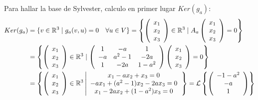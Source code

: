 \documentclass[12pt]{article}
\begin{document}
\begin{ejercicio}
    Para hallar la base de Sylvester, calculo en primer lugar $Ker(g_a)$:
    \begin{equation*}\begin{split}
        Ker(g_a) &= \{v \in \mathbb{R}^3 \mid g_a(v,u) = 0 \quad \forall u\in V\} 
        = \left\{ \left(\begin{array}{c}
             x_1 \\ x_2 \\ x_3
        \end{array} \right) \in \mathbb{R}^3 \mid A_a
        \left(\begin{array}{c}
             x_1 \\ x_2 \\ x_3
        \end{array} \right) = 0\right\} \\
        &= \left\{ \left(\begin{array}{c}
             x_1 \\ x_2 \\ x_3
        \end{array} \right) \in \mathbb{R}^3 \mid
        \left(\begin{array}{ccc}
            1 & -a & 1 \\
            -a & a^2-1 & -2a \\
            1 & -2a & 1-a^2
        \end{array} \right) 
        \left(\begin{array}{c}
             x_1 \\ x_2 \\ x_3
        \end{array} \right) = 0\right\} \\
        &= \left\{ \left(\begin{array}{c}
             x_1 \\ x_2 \\ x_3
        \end{array} \right) \in \mathbb{R}^3 \left|\begin{array}{c}
            x_1-ax_2+x_3 = 0\\
            -ax_1 +(a^2-1)x_2-2ax_3 = 0\\
            x_1-2ax_2+(1-a^2)x_3=0
        \end{array}
        \right.\right\}
        = \mathcal{L} \left\{ \left(\begin{array}{c}
             -1-a^2 \\ -a \\ 1
        \end{array} \right)\right\}
    \end{split}\end{equation*}


\end{ejercicio}
\end{document}
